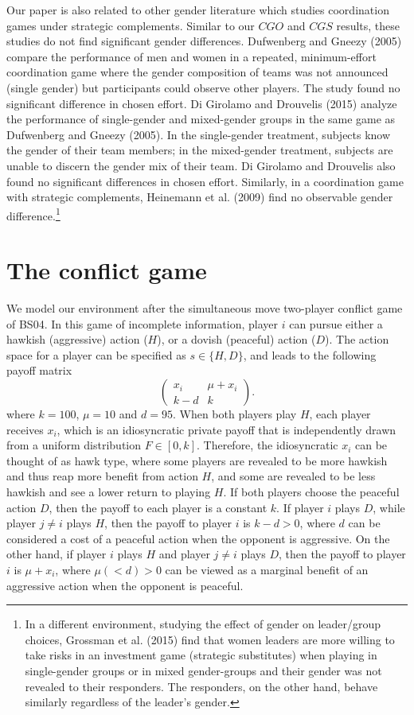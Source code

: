\documentclass[12pt,english]{article}
\begin{document}
Our paper is also related to other gender literature which studies coordination games under strategic complements. Similar to our $CGO$ and $CGS$ results, these studies do not find significant gender differences.  Dufwenberg and Gneezy (2005) compare the performance of men and women in a repeated, minimum-effort coordination game where the gender composition of teams was not announced (single gender) but participants could observe other players. The study found no significant difference in chosen effort. Di Girolamo and Drouvelis (2015) analyze the performance of single-gender and mixed-gender groups in the same game as Dufwenberg and Gneezy (2005). In the single-gender treatment, subjects know the gender of their team members; in the mixed-gender treatment, subjects are unable to discern the gender mix of their team. Di Girolamo and Drouvelis also found no significant differences in chosen effort. Similarly, in a coordination game with strategic complements, Heinemann et al. (2009) find no observable gender difference.\footnote{In a different environment, studying the effect of gender on leader/group choices, Grossman et al. (2015) find that women leaders are more willing to take risks in an investment game (strategic substitutes) when playing in single-gender groups or in mixed gender-groups and their gender was not revealed to their responders. The responders, on the other hand, behave similarly regardless of the leader's gender.}

\section{The conflict game}
\label{sec:model}
We model our environment after the simultaneous move two-player conflict game of BS04. In this game of incomplete information, player $i$ can pursue either a hawkish (aggressive) action ($H$), or a dovish (peaceful) action ($D$). The action space for a player can be specified as $s\in\{H,D\}$, and leads to the following payoff matrix
\begin{equation}
\begin{pmatrix}
x_i & \mu+x_i \\
k-d & k 
\label{t:payoff}
\end{pmatrix}.
\end{equation}
where $k=100$, $\mu=10$ and $d=95$. When both players play $H$, each player receives $x_i$, which is an idiosyncratic private payoff that is independently drawn from a uniform distribution $F\in [0,k]$. Therefore, the idiosyncratic $x_i$ can be thought of as hawk type, where some players are revealed to be more hawkish and thus reap more benefit from action $H$, and some are revealed to be less hawkish and see a lower return to playing $H$. If both players choose the peaceful action $D$, then the payoff to each player is a constant $k$. If player $i$ plays $D$, while player $j\neq i$ plays $H$, then the payoff to player $i$ is $k-d>0$, where $d$ can be considered a cost of a peaceful action when the opponent is aggressive. On the other hand, if player $i$ plays $H$ and player $j\neq i$ plays $D$, then the payoff to player $i$ is $\mu+x_i$, where $\mu (<d)>0$ can be viewed as a marginal benefit of an aggressive action when the opponent is peaceful. 
\end{document}
